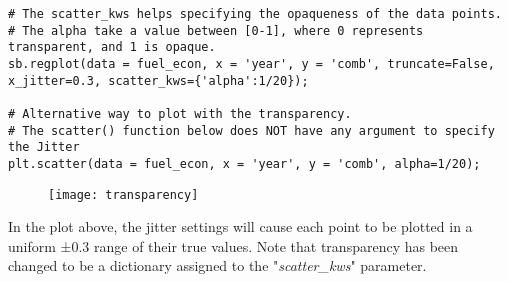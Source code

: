 \documentclass[12pt]{beamer}
\begin{document}
    \begin{frame}[fragile]{}
    	\fontsize{8}{0}
    	\begin{verbatim}
# The scatter_kws helps specifying the opaqueness of the data points. 
# The alpha take a value between [0-1], where 0 represents transparent, and 1 is opaque. 
sb.regplot(data = fuel_econ, x = 'year', y = 'comb', truncate=False, x_jitter=0.3, scatter_kws={'alpha':1/20});

# Alternative way to plot with the transparency.
# The scatter() function below does NOT have any argument to specify the Jitter
plt.scatter(data = fuel_econ, x = 'year', y = 'comb', alpha=1/20);
    	\end{verbatim}
    	\begin{figure}
    		\centering
    		\texttt{[image: transparency]}
    	\end{figure}
    In the plot above, the jitter settings will cause each point to be plotted in a uniform ±0.3 range of their true values. Note that transparency has been changed to be a dictionary assigned to the "\textit{scatter\_kws}" parameter.
    \end{frame}
\end{document}
